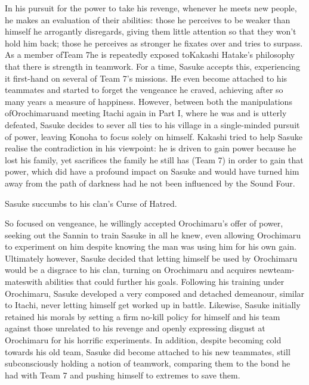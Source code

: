 \documentclass[a4paper,12pt]{article}
\begin{document}
In his pursuit for the power to take his revenge, whenever he meets new people, he makes an evaluation of their abilities: those he perceives to be weaker than himself he arrogantly disregards, giving them little attention so that they won't hold him back; those he perceives as stronger he fixates over and tries to surpass. As a member ofTeam 7he is repeatedly exposed toKakashi Hatake's philosophy that there is strength in teamwork. For a time, Sasuke accepts this, experiencing it first-hand on several of Team 7's missions. He even become attached to his teammates and started to forget the vengeance he craved, achieving after so many years a measure of happiness. However, between both the manipulations ofOrochimaruand meeting Itachi again in Part I, where he was and is utterly defeated, Sasuke decides to sever all ties to his village in a single-minded pursuit of power, leaving Konoha to focus solely on himself. Kakashi tried to help Sasuke realise the contradiction in his viewpoint: he is driven to gain power because he lost his family, yet sacrifices the family he still has (Team 7) in order to gain that power, which did have a profound impact on Sasuke and would have turned him away from the path of darkness had he not been influenced by the Sound Four.\\ \par \vspace{0.5cm}

Sasuke succumbs to his clan's Curse of Hatred.\\ \par \vspace{0.5cm}

So focused on vengeance, he willingly accepted Orochimaru's offer of power, seeking out the Sannin to train Sasuke in all he knew, even allowing Orochimaru to experiment on him despite knowing the man was using him for his own gain. Ultimately however, Sasuke decided that letting himself be used by Orochimaru would be a disgrace to his clan, turning on Orochimaru and acquires newteam-mateswith abilities that could further his goals. Following his training under Orochimaru, Sasuke developed a very composed and detached demeanour, similar to Itachi, never letting himself get worked up in battle. Likewise, Sasuke initially retained his morals by setting a firm no-kill policy for himself and his team against those unrelated to his revenge and openly expressing disgust at Orochimaru for his horrific experiments. In addition, despite becoming cold towards his old team, Sasuke did become attached to his new teammates, still subconsciously holding a notion of teamwork, comparing them to the bond he had with Team 7 and pushing himself to extremes to save them.\\ \par \vspace{0.5cm}
\end{document}

